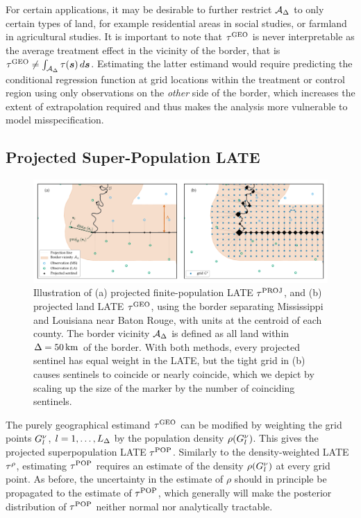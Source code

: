 	For certain applications, it may be desirable to further restrict \(\mathcal{A}_\Delta\) to only certain types of land, for example residential areas in social studies, or farmland in agricultural studies.
It is important to note that \(\tau^{\mathrm{GEO}}\) is never interpretable as the average treatment effect in the vicinity of the border, that is \(\tau^{\mathrm{GEO}} \neq \int_{\mathcal{A}_\Delta} \tau(\bm{s}) \mathop{d \bm{s}}\).
Estimating the latter estimand would require predicting the conditional regression function at grid locations within the treatment or control region using only observations on the \emph{other} side of the border, which increases the extent of extrapolation required and thus makes the analysis more vulnerable to model misspecification.

\subsection{Projected Super-Population LATE}

\begin{figure}[tb]
    \centering
    \includegraphics[width=\textwidth]{figures/mississippi_projection_methods.pdf}
    \caption{
		\label{fig:mississippi_projection_methods}
        Illustration of (a) projected finite-population LATE \(\tau^{\mathrm{PROJ}}\), and (b) projected land LATE \(\tau^{\mathrm{GEO}}\), using the border separating Mississippi and Louisiana near Baton Rouge, with units at the centroid of each county.
        The border vicinity \(\mathcal{A}_\Delta\) is defined as all land within \(\Delta=50\,\mathrm{km}\) of the border.
    With both methods, every projected sentinel has equal weight in the LATE, but the tight grid in (b) causes sentinels to coincide or nearly coincide, which we depict by scaling up the size of the marker by the number of coinciding sentinels.}
\end{figure}

	The purely geographical estimand \(\tau^{\mathrm{GEO}}\) can be modified by weighting the grid points \(G^\nu_l\), \(l=1,\dotsc,L_\Delta\) by the population density \(\rho(G^\nu_l)\).
This gives the projected superpopulation LATE \(\tau^{\mathrm{POP}}\).
Similarly to the density-weighted LATE \(\tau^{\rho}\), estimating \(\tau^{\mathrm{POP}}\) requires an estimate of the density \(\rho(G^\nu_l)\) at every grid point.
As before, the uncertainty in the estimate of \(\rho\) should in principle be propagated to the estimate of \(\tau^{\mathrm{POP}}\), which generally will make the posterior distribution of \(\tau^{\mathrm{POP}}\) neither normal nor analytically tractable.

